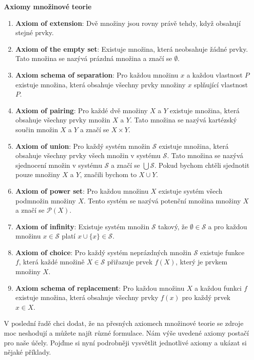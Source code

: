 \begin{definitionbox}
  \textbf{Axiomy množinové teorie}
  \begin{enumerate}
    \item \textbf{Axiom of extension}: Dvě množiny jsou rovny právě tehdy, když obsahují stejné prvky.
    \item \textbf{Axiom of the empty set}: Existuje množina, která neobsahuje žádné prvky. Tato množina se nazývá prázdná množina a značí se $\emptyset$.
    \item \textbf{Axiom schema of separation}: Pro každou množinu $x$ a každou vlastnost $P$ existuje množina, která obsahuje všechny prvky množiny $x$ splňující vlastnost $P$.
    \item \textbf{Axiom of pairing}: Pro každé dvě množiny $X$ a $Y$ existuje množina, která obsahuje všechny prvky množin $X$ a $Y$. Tato množina se nazývá kartézský součin množin $X$ a $Y$ a značí se $X \times Y$.
    \item \textbf{Axiom of union}: Pro každý systém množin $\mathcal{S}$ existuje množina, která obsahuje všechny prvky všech množin v systému $\mathcal{S}$. Tato množina se nazývá sjednocení množin v systému $\mathcal{S}$ a značí se $\bigcup \mathcal{S}$. Pokud bychom chtěli sjednotit pouze množiny $X$ a $Y$, značili bychom to $X\cup Y$.
    \item \textbf{Axiom of power set}: Pro každou množinu $X$ existuje systém všech podmnožin množiny $X$. Tento systém se nazývá potenční množina množiny $X$ a značí se $\mathcal{P}(X)$. 
    \item \textbf{Axiom of infinity}: Existuje systém množin $\mathcal{S}$ takový, že $\emptyset\in\mathcal{S}$ a pro každou množinu $x\in\mathcal{S}$ platí $x\cup\{x\}\in\mathcal{S}$. 
    \item \textbf{Axiom of choice}: Pro každý systém neprázdných množin $\mathcal{S}$ existuje funkce $f$, která každé množině $X\in\mathcal{S}$ přiřazuje prvek $f(X)$, který je prvkem množiny $X$.
    \item \textbf{Axiom schema of replacement}: Pro každou množinu $X$ a každou funkci $f$ existuje množina, která obsahuje všechny prvky $f(x)$ pro každý prvek $x\in X$.
  \end{enumerate}
  V poslední řadě chci dodat, že na přesných axiomech množinové teorie se zdroje moc neshodují a můžete najít různé formulace. Nám výše uvedené axiomy postačí pro naše účely. Pojďme si nyní podrobněji vysvětlit jednotlivé axiomy a ukázat si nějaké příklady.
\end{definitionbox}


